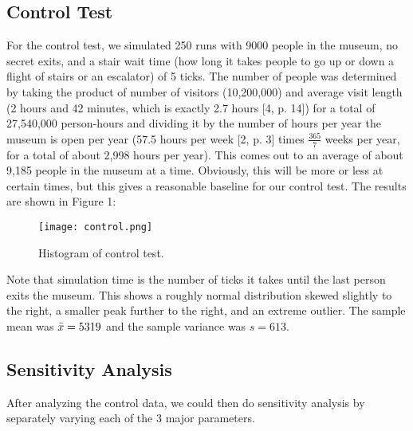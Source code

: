 \documentclass[12pt]{article}
\begin{document}
\subsection{Control Test} %
For the control test, we simulated 250 runs with 9000 people in the museum, no secret exits, and a stair wait time (how long it takes people to go up or down a flight of stairs or an escalator) of 5 ticks. The number of people was determined by taking the product of number of visitors (10,200,000) and average visit length (2 hours and 42 minutes, which is exactly 2.7 hours [4, p. 14]) for a total of 27,540,000 person-hours and dividing it by the number of hours per year the museum is open per year (57.5 hours per week [2, p. 3] times $\frac{365}{7}$ weeks per year, for a total of about 2,998 hours per year). This comes out to an average of about 9,185 people in the museum at a time. Obviously, this will be more or less at certain times, but this gives a reasonable baseline for our control test. The results are shown in Figure 1:
\begin{figure}[H]
	\centering
	\texttt{[image: control.png]}
    \caption{Histogram of control test.}
\end{figure}
Note that simulation time is the number of ticks it takes until the last person exits the museum. This shows a roughly normal distribution skewed slightly to the right, a smaller peak further to the right, and an extreme outlier. The sample mean was $\Bar{x}=5319$ and the sample variance was $s=613$.

\subsection{Sensitivity Analysis}
After analyzing the control data, we could then do sensitivity analysis by separately varying each of the 3 major parameters.
\end{document}
